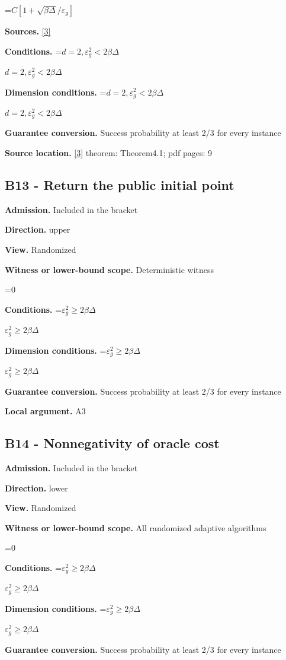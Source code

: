 \documentclass[10pt,a4paper]{article}
\newcommand{\AtlasMath}[1]{\par\begingroup\centering\setbox0=\hbox{$\displaystyle #1$}\ifdim\wd0>1.4\linewidth\typeout{ATLAS WIDE FORMULA: \the\wd0}\fi\ifdim\wd0>\linewidth\resizebox{\linewidth}{!}{\box0}\else\box0\fi\par\endgroup}
\newcommand{\AtlasInlineMath}[1]{\begingroup\setbox0=\hbox{$#1$}\ifdim\wd0>.4\linewidth\endgroup\AtlasMath{#1}\else\endgroup$#1$\fi}
\begin{document}
\AtlasMath{C[1+\sqrt{\beta\Delta}/\varepsilon_g]}
\textbf{Sources.} \href{https://arxiv.org/abs/2310.09157}{[3]}

\textbf{Conditions.} \AtlasInlineMath{d=2, \varepsilon_g^2<2\beta\Delta}

\textbf{Dimension conditions.} \AtlasInlineMath{d=2, \varepsilon_g^2<2\beta\Delta}

\textbf{Guarantee conversion.} Success probability at least 2/3 for every instance

\textbf{Source location.} \href{https://arxiv.org/abs/2310.09157}{[3]} theorem: Theorem4.1; pdf pages: 9

\subsection{B13 - Return the public initial point}
\textbf{Admission.} Included in the bracket

\textbf{Direction.} upper

\textbf{View.} Randomized

\textbf{Witness or lower-bound scope.} Deterministic witness

\AtlasMath{0}
\textbf{Conditions.} \AtlasInlineMath{\varepsilon_g^2\ge 2\beta\Delta}

\textbf{Dimension conditions.} \AtlasInlineMath{\varepsilon_g^2\ge 2\beta\Delta}

\textbf{Guarantee conversion.} Success probability at least 2/3 for every instance

\textbf{Local argument.} A3

\subsection{B14 - Nonnegativity of oracle cost}
\textbf{Admission.} Included in the bracket

\textbf{Direction.} lower

\textbf{View.} Randomized

\textbf{Witness or lower-bound scope.} All randomized adaptive algorithms

\AtlasMath{0}
\textbf{Conditions.} \AtlasInlineMath{\varepsilon_g^2\ge 2\beta\Delta}

\textbf{Dimension conditions.} \AtlasInlineMath{\varepsilon_g^2\ge 2\beta\Delta}

\textbf{Guarantee conversion.} Success probability at least 2/3 for every instance
\end{document}
